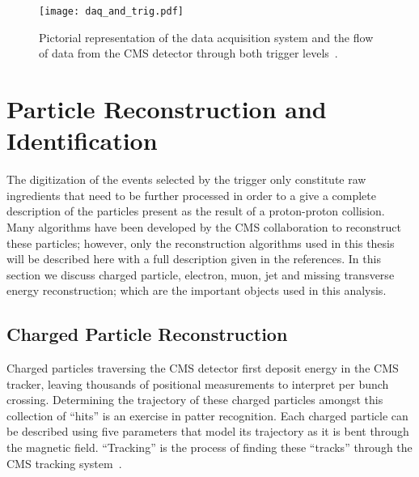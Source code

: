 \begin{figure}[tbhp]
\begin{center}
\texttt{[image: daq\_and\_trig.pdf]}
\caption{\label{fig:cms_daq}
Pictorial representation of the data acquisition system and
the flow of data from the CMS detector through both trigger levels~\cite{bourge}.
}
\end{center}
\end{figure}

\section{Particle Reconstruction and Identification}
\label {sec:cms_reco}

The digitization of the events selected by the trigger only constitute
raw ingredients that need to be further processed in order to a give a
complete description of the particles present as the result of a proton-proton
collision. Many algorithms have been developed by the CMS collaboration to
reconstruct these particles; however, only the reconstruction algorithms used
in this thesis will be described here with a full description given in the
references. In this section we discuss charged particle, electron, muon, jet
and missing transverse energy reconstruction; which are the important objects
used in this analysis.

\subsection{Charged Particle Reconstruction}
\label {sec:cms_tracking}
Charged particles traversing the CMS detector first deposit energy in the
CMS tracker, leaving thousands of positional measurements to interpret
per bunch crossing. Determining the trajectory of these charged particles
amongst this collection of ``hits'' is an exercise in patter recognition.
Each charged particle can be described using five parameters that model
its trajectory as it is bent through the magnetic field. ``Tracking''
is the process of finding these ``tracks'' through the CMS tracking
system~\cite{pixel,mangano,trackingperformance}.

